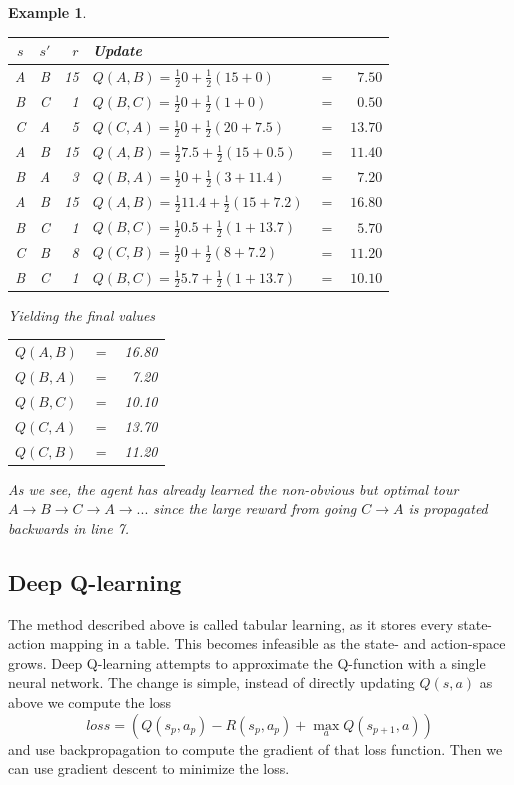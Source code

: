 \documentclass{article}
\theoremstyle{changedot}
\theoremstyle{changedotbreak}
\theoremstyle{nonumberplain}
\newtheorem{example}{Example}
\begin{document}
\begin{example}
  \begin{tabular}{c c r | l c r}
    $s$ & $s'$ & $r$ & Update & & \\ \hline
    A & B & 15 & $Q(A, B) = \frac 1 2 0 + \frac 1 2 (15 + 0) $ & $=$&$ 7.50$ \\
    B & C &  1 & $Q(B, C) = \frac 1 2 0 + \frac 1 2 ( 1 + 0) $ & $=$&$ 0.50$ \\
    C & A &  5 & $Q(C, A) = \frac 1 2 0 + \frac 1 2 ( 20 + 7.5) $ & $=$&$ 13.70$ \\
    A & B & 15 & $Q(A, B) = \frac 1 2 7.5 + \frac 1 2 (15 + 0.5) $ & $=$&$ 11.40$ \\
    B & A &  3 & $Q(B, A) = \frac 1 2 0 + \frac 1 2 ( 3 + 11.4) $ & $=$&$ 7.20$ \\
    A & B & 15 & $Q(A, B) = \frac 1 2 11.4 + \frac 1 2 (15 + 7.2) $ & $=$&$ 16.80$ \\
    B & C &  1 & $Q(B, C) = \frac 1 2 0.5 + \frac 1 2 ( 1 + 13.7) $ & $=$&$ 5.70$ \\
    C & B &  8 & $Q(C, B) = \frac 1 2 0 + \frac 1 2 ( 8 + 7.2) $ & $=$&$ 11.20$ \\
    B & C &  1 & $Q(B, C) = \frac 1 2 5.7 + \frac 1 2 ( 1+ 13.7) $ & $=$&$ 10.10$ \\
  \end{tabular}

  Yielding the final values

  \begin{tabular}{l c r}
    $Q(A, B)$ & $=$ & 16.80\\
    $Q(B, A)$ & $=$ & 7.20\\
    $Q(B, C)$ & $=$ & 10.10\\
    $Q(C, A)$ & $=$ & 13.70\\
    $Q(C, B)$ & $=$ & 11.20\\
  \end{tabular}

  As we see, the agent has already learned the non-obvious but optimal tour $A \rightarrow B \rightarrow C  \rightarrow A \rightarrow ...$ since the large reward from going $C \rightarrow A$ is propagated backwards in line 7.
\end{example}


\subsection{Deep Q-learning}
The method described above is called tabular learning, as it stores every state-action mapping in a table. This becomes infeasible as the state- and action-space grows. Deep Q-learning attempts to approximate the Q-function with a single neural network. The change is simple, instead of directly updating $Q(s, a)$ as above we compute the loss \[loss = (Q(s_{p}, a_{p}) - R(s_{p}, a_{p}) + \max_{a} Q(s_{p+1}, a))\] and use backpropagation to compute the gradient of that loss function. Then we can use gradient descent to minimize the loss.
\end{document}
